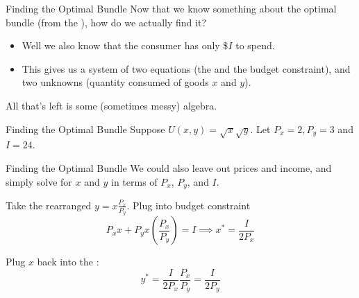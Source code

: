 \documentclass[11pt,t]{beamer}
\begin{document}
\begin{frame}{Finding the Optimal Bundle}
  Now that we know something about the optimal bundle (from the ), how do we actually find it?

  \begin{itemize}
    \item Well we also know that the consumer has only  \$$I$ to spend.

    \item This gives us a system of two equations (the  and the budget constraint), and two unknowns (quantity consumed of goods $x$ and $y$).

  \end{itemize}
  
  \pause\bigskip
  All that's left is some (sometimes messy) algebra.
\end{frame}

\begin{frame}{Finding the Optimal Bundle}
  Suppose $U(x,y) = \sqrt{x}\sqrt{y}$. Let $P_x = 2, P_y=3$ and $I = 24$.


\end{frame}

\begin{frame}{Finding the Optimal Bundle}
  We could also leave out prices and income, and simply solve for $x$ and $y$ in terms of $P_x$, $P_y$, and $I$.
  
  \bigskip
  Take the rearranged  $y = x\frac{P_x}{P_y}$. Plug into budget constraint
  $$
    P_x x + P_y x (\frac{P_x}{P_y}) = I \implies x^* = \frac{I}{2P_x}
  $$ 
  
  \bigskip
  Plug $x$ back into the :
  $$
    y^* = \frac{I}{2P_x}\frac{P_x}{P_y} = \frac{I}{2P_y}
  $$
\end{frame}
\end{document}
